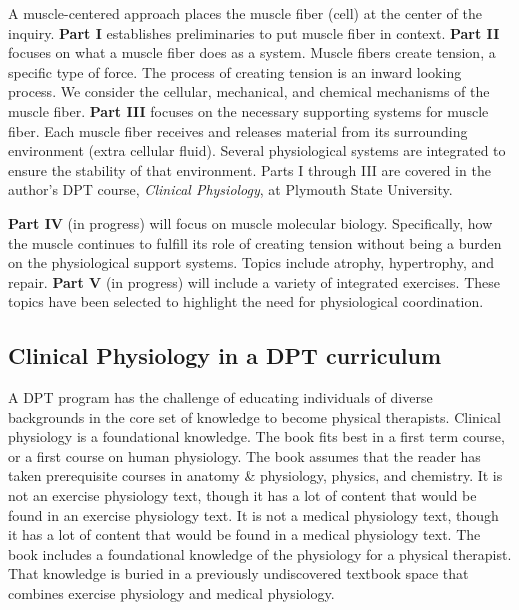\vspace{0.2in}

A muscle-centered approach places the muscle fiber (cell) at the center of the inquiry. \textbf{Part I} establishes preliminaries to put muscle fiber in context.  \textbf{Part II} focuses on what a muscle fiber does as a system. Muscle fibers create tension, a specific type of force. The process of creating tension is an inward looking process. We consider the cellular, mechanical, and chemical mechanisms of the muscle fiber. \textbf{Part III} focuses on the necessary supporting systems for muscle fiber. Each muscle fiber receives and releases material from its surrounding environment (extra cellular fluid). Several physiological systems are integrated to ensure the stability of that environment. Parts I through III are covered in the author's DPT course, \textit{Clinical Physiology}, at Plymouth State University.

\vspace{0.2in}

\textbf{Part IV} (in progress) will focus on muscle molecular biology. Specifically, how the muscle continues to fulfill its role of creating tension without being a burden on the physiological support systems. Topics include atrophy, hypertrophy, and repair. \textbf{Part V} (in progress) will include a variety of integrated exercises. These topics have been selected to highlight the need for physiological coordination.

\subsection*{Clinical Physiology in a DPT curriculum}
A DPT program has the challenge of educating individuals of diverse backgrounds in the core set of knowledge to become physical therapists. Clinical physiology is a foundational knowledge. The book fits best in a first term course, or a first course on human physiology. The book assumes that the reader has taken prerequisite courses in anatomy \& physiology, physics, and chemistry. It is not an exercise physiology text, though it has a lot of content that would be found in an exercise physiology text. It is not a medical physiology text, though it has a lot of content that would be found in a medical physiology text. The book includes a foundational knowledge of the physiology for a physical therapist. That knowledge is buried in a previously undiscovered textbook space that combines exercise physiology and medical physiology. 

